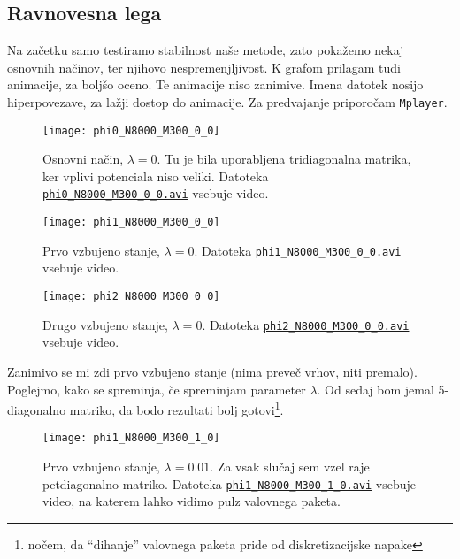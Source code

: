 \documentclass[a4 paper, 12pt]{article}
\begin{document}
\subsection{Ravnovesna lega}

Na začetku samo testiramo stabilnost naše metode, zato pokažemo nekaj osnovnih načinov, ter
njihovo nespremenjljivost. K grafom prilagam tudi animacije, za boljšo oceno. Te animacije
niso zanimive. Imena datotek nosijo hiperpovezave, za lažji dostop do animacije. Za 
predvajanje priporočam {\tt Mplayer}.

\begin{figure}[H]
	\centering
	\texttt{[image: phi0\_N8000\_M300\_0\_0]}
	\vspace{-20pt}
	\caption{Osnovni način, $\lambda=0$. Tu je bila uporabljena tridiagonalna matrika, ker
		vplivi potenciala niso veliki. Datoteka
		\href{phi0_N8000_M300_0_0.avi}{{\tt phi0\_N8000\_M300\_0\_0.avi}}
		vsebuje video.}
	\label{fig1}
	\vspace{-10pt}
\end{figure}

\begin{figure}[H]
	\centering
	\texttt{[image: phi1\_N8000\_M300\_0\_0]}
	\vspace{-20pt}
	\caption{Prvo vzbujeno stanje, $\lambda=0$. Datoteka
		\href{phi1_N8000_M300_0_0.avi}{{\tt phi1\_N8000\_M300\_0\_0.avi}}
		vsebuje video.}
	\label{fig2}
	\vspace{-10pt}
\end{figure}

\begin{figure}[H]
	\centering
	\texttt{[image: phi2\_N8000\_M300\_0\_0]}
	\vspace{-20pt}
	\caption{Drugo vzbujeno stanje, $\lambda=0$. Datoteka
		\href{phi2_N8000_M300_0_0.avi}{{\tt phi2\_N8000\_M300\_0\_0.avi}}
		vsebuje video.}
	\label{fig3}
	\vspace{-10pt}
\end{figure}

Zanimivo se mi zdi prvo vzbujeno stanje (nima preveč vrhov, niti premalo). Poglejmo, kako
se spreminja, če spreminjam parameter $\lambda$. Od sedaj bom jemal 5-diagonalno matriko,
da bodo rezultati bolj gotovi\footnote{nočem, da "`dihanje"' valovnega paketa pride od
diskretizacijske napake}.

\begin{figure}[H]
	\centering
	\texttt{[image: phi1\_N8000\_M300\_1\_0]}
	\vspace{-20pt}
	\caption{Prvo vzbujeno stanje, $\lambda=0.01$. Za vsak slučaj sem vzel
		raje petdiagonalno matriko. Datoteka
		\href{phi1_N8000_M300_1_0.avi}{{\tt phi1\_N8000\_M300\_1\_0.avi}}
		vsebuje video, na katerem lahko vidimo pulz valovnega paketa.}
	\label{fig4}
	\vspace{-10pt}
\end{figure}
\end{document}
